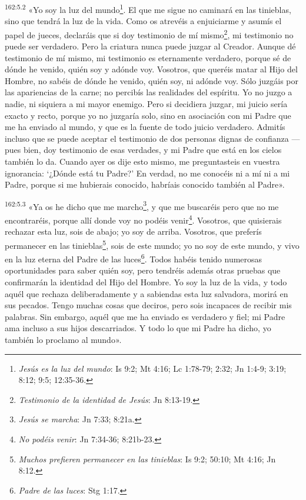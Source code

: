 \par 
\textsuperscript{162:5.2} «Yo soy la luz del mundo\footnote{\textit{Jesús es la luz del mundo}: Is 9:2; Mt 4:16; Lc 1:78-79; 2:32; Jn 1:4-9; 3:19; 8:12; 9:5; 12:35-36.}. El que me sigue no caminará en las tinieblas, sino que tendrá la luz de la vida. Como os atrevéis a enjuiciarme y asumís el papel de jueces, declaráis que si doy testimonio de mí mismo\footnote{\textit{Testimonio de la identidad de Jesús}: Jn 8:13-19.}, mi testimonio no puede ser verdadero. Pero la criatura nunca puede juzgar al Creador. Aunque dé testimonio de mí mismo, mi testimonio es eternamente verdadero, porque sé de dónde he venido, quién soy y adónde voy. Vosotros, que queréis matar al Hijo del Hombre, no sabéis de dónde he venido, quién soy, ni adónde voy. Sólo juzgáis por las apariencias de la carne; no percibís las realidades del espíritu. Yo no juzgo a nadie, ni siquiera a mi mayor enemigo. Pero si decidiera juzgar, mi juicio sería exacto y recto, porque yo no juzgaría solo, sino en asociación con mi Padre que me ha enviado al mundo, y que es la fuente de todo juicio verdadero. Admitís incluso que se puede aceptar el testimonio de dos personas dignas de confianza ---pues bien, doy testimonio de esas verdades, y mi Padre que está en los cielos también lo da. Cuando ayer os dije esto mismo, me preguntasteis en vuestra ignorancia: `¿Dónde está tu Padre?' En verdad, no me conocéis ni a mí ni a mi Padre, porque si me hubierais conocido, habríais conocido también al Padre».

\par 
\textsuperscript{162:5.3} «Ya os he dicho que me marcho\footnote{\textit{Jesús se marcha}: Jn 7:33; 8:21a.}, y que me buscaréis pero que no me encontraréis, porque allí donde voy no podéis venir\footnote{\textit{No podéis venir}: Jn 7:34-36; 8:21b-23.}. Vosotros, que quisierais rechazar esta luz, sois de abajo; yo soy de arriba. Vosotros, que preferís permanecer en las tinieblas\footnote{\textit{Muchos prefieren permanecer en las tinieblas}: Is 9:2; 50:10; Mt 4:16; Jn 8:12.}, sois de este mundo; yo no soy de este mundo, y vivo en la luz eterna del Padre de las luces\footnote{\textit{Padre de las luces}: Stg 1:17.}. Todos habéis tenido numerosas oportunidades para saber quién soy, pero tendréis además otras pruebas que confirmarán la identidad del Hijo del Hombre. Yo soy la luz de la vida, y todo aquél que rechaza deliberadamente y a sabiendas esta luz salvadora, morirá en sus pecados. Tengo muchas cosas que deciros, pero sois incapaces de recibir mis palabras. Sin embargo, aquél que me ha enviado es verdadero y fiel; mi Padre ama incluso a sus hijos descarriados. Y todo lo que mi Padre ha dicho, yo también lo proclamo al mundo».

